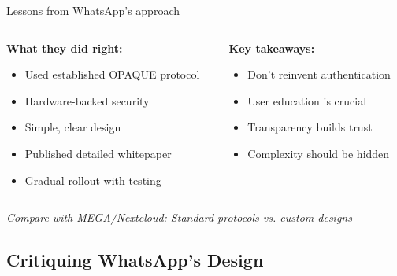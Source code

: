 \documentclass[aspectratio=169, lualatex, handout]{beamer}
\begin{document}
\begin{frame}{Lessons from WhatsApp's approach}
	\begin{columns}[c]
		\begin{column}{0.5\textwidth}
			\textbf{What they did right:}
			\begin{itemize}
				\item Used established OPAQUE protocol
				\item Hardware-backed security
				\item Simple, clear design
				\item Published detailed whitepaper
				\item Gradual rollout with testing
			\end{itemize}
		\end{column}
		\begin{column}{0.5\textwidth}
			\textbf{Key takeaways:}
			\begin{itemize}
				\item Don't reinvent authentication
				\item User education is crucial
				\item Transparency builds trust
				\item Complexity should be hidden
			\end{itemize}
		\end{column}
	\end{columns}
	\vspace{0.5cm}
	\begin{center}
		\textit{Compare with MEGA/Nextcloud: Standard protocols vs. custom designs}
	\end{center}
\end{frame}

\subsection{Critiquing WhatsApp's Design}
\end{document}
